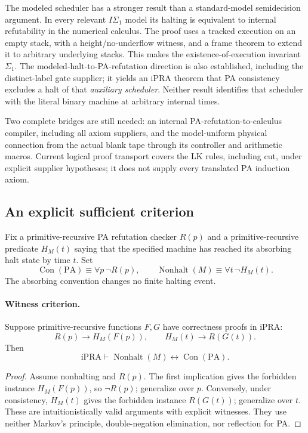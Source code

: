 The modeled scheduler has a stronger result than a standard-model
semidecision argument.  In every relevant $I\Sigma_1$ model its halting is
equivalent to internal refutability in the numerical calculus.  The proof
uses a tracked execution on an empty stack, with a height/no-underflow
witness, and a frame theorem to extend it to arbitrary underlying stacks.
This makes the existence-of-execution invariant $\Sigma_1$.
The modeled-halt-to-PA-refutation direction is also established, including
the distinct-label gate supplier; it yields an iPRA theorem that PA
consistency excludes a halt of that \emph{auxiliary scheduler}.
Neither result identifies that scheduler with the literal binary machine
at arbitrary internal times.\cite{pa194-fairness,pa194-modeled}

Two complete bridges are still needed: an internal PA-refutation-to-calculus
compiler, including all axiom suppliers, and the model-uniform physical
connection from the actual blank tape through its controller and arithmetic
macros.  Current logical proof transport covers the LK rules, including
cut, under explicit supplier hypotheses; it does not supply every
translated PA induction axiom.\cite{fullpa-audit,pa-readme}

\subsection{An explicit sufficient criterion}
\label{ipra-criterion}

Fix a primitive-recursive PA refutation checker $R(p)$ and a
primitive-recursive predicate $H_M(t)$ saying that the specified machine
has reached its absorbing halt state by time $t$.  Set
\[
 \operatorname{Con}(\mathrm{PA})\equiv\forall p\,\neg R(p),
 \qquad \operatorname{Nonhalt}(M)\equiv\forall t\,\neg H_M(t).
\]
The absorbing convention changes no finite halting event.

\paragraph{Witness criterion.}
Suppose primitive-recursive functions $F,G$ have correctness proofs in
iPRA:
\begin{equation}
 R(p)\longrightarrow H_M(F(p)),\qquad
 H_M(t)\longrightarrow R(G(t)).
 \label{ipra-witness-maps}
\end{equation}
Then
\[
 \mathrm{iPRA}\vdash
 \operatorname{Nonhalt}(M)\longleftrightarrow
 \operatorname{Con}(\mathrm{PA}).
\]
\begin{proof}
Assume nonhalting and $R(p)$.  The first implication gives the forbidden
instance $H_M(F(p))$, so $\neg R(p)$; generalize over $p$.
Conversely, under consistency, $H_M(t)$ gives the forbidden instance
$R(G(t))$; generalize over $t$.  These are intuitionistically valid
arguments with explicit witnesses.  They use neither Markov's principle,
double-negation elimination, nor reflection for PA.
\end{proof}

